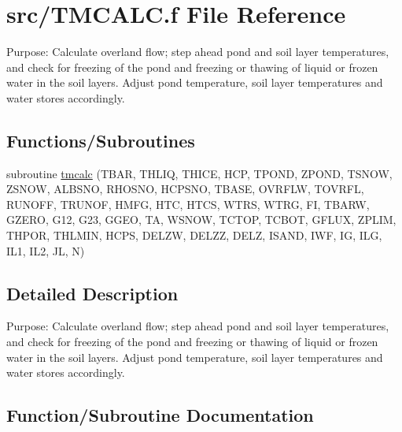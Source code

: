 \hypertarget{TMCALC_8f}{}\section{src/\+T\+M\+C\+A\+L\+C.f File Reference}
\label{TMCALC_8f}


Purpose\+: Calculate overland flow; step ahead pond and soil layer temperatures, and check for freezing of the pond and freezing or thawing of liquid or frozen water in the soil layers. Adjust pond temperature, soil layer temperatures and water stores accordingly.  


\subsection*{Functions/\+Subroutines}
\begin{DoxyCompactItemize}
\item 
subroutine \hyperlink{TMCALC_8f_a5ad5bd585e1ef7d89e9862d0bacd3c51}{tmcalc} (T\+B\+A\+R, T\+H\+L\+I\+Q, T\+H\+I\+C\+E, H\+C\+P, T\+P\+O\+N\+D, Z\+P\+O\+N\+D, T\+S\+N\+O\+W, Z\+S\+N\+O\+W, A\+L\+B\+S\+N\+O, R\+H\+O\+S\+N\+O, H\+C\+P\+S\+N\+O, T\+B\+A\+S\+E, O\+V\+R\+F\+L\+W, T\+O\+V\+R\+F\+L, R\+U\+N\+O\+F\+F, T\+R\+U\+N\+O\+F, H\+M\+F\+G, H\+T\+C, H\+T\+C\+S, W\+T\+R\+S, W\+T\+R\+G, F\+I, T\+B\+A\+R\+W, G\+Z\+E\+R\+O, G12, G23, G\+G\+E\+O, T\+A, W\+S\+N\+O\+W, T\+C\+T\+O\+P, T\+C\+B\+O\+T, G\+F\+L\+U\+X, Z\+P\+L\+I\+M, T\+H\+P\+O\+R, T\+H\+L\+M\+I\+N, H\+C\+P\+S, D\+E\+L\+Z\+W, D\+E\+L\+Z\+Z, D\+E\+L\+Z, I\+S\+A\+N\+D, I\+W\+F, I\+G, I\+L\+G, I\+L1, I\+L2, J\+L, N)
\end{DoxyCompactItemize}


\subsection{Detailed Description}
Purpose\+: Calculate overland flow; step ahead pond and soil layer temperatures, and check for freezing of the pond and freezing or thawing of liquid or frozen water in the soil layers. Adjust pond temperature, soil layer temperatures and water stores accordingly. 



\subsection{Function/\+Subroutine Documentation}
\hypertarget{TMCALC_8f_a5ad5bd585e1ef7d89e9862d0bacd3c51}{}
